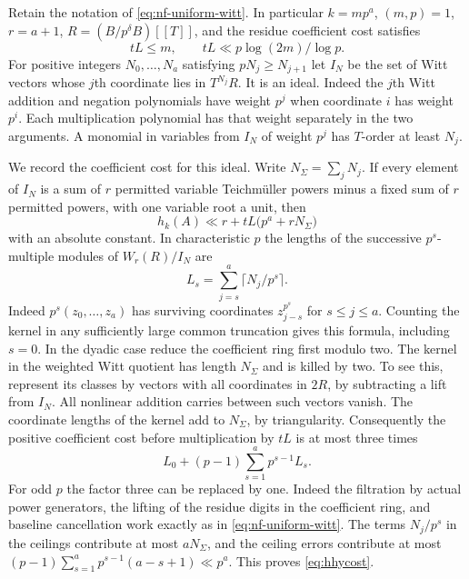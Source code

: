\documentclass[11pt,letterpaper]{article}
\theoremstyle{definition}
\numberwithin{equation}{section}
\begin{document}
Retain the notation of \eqref{eq:nf-uniform-witt}. In particular
$k=mp^a$, $(m,p)=1$, $r=a+1$, $R=(B/p^\delta B)[[T]]$, and the
residue coefficient cost satisfies
\begin{equation}\label{eq:hcoeff}
          tL\le m,\qquad tL\ll p\log(2m)/\log p .
\end{equation}
For positive integers $N_0,\ldots,N_a$ satisfying
$pN_j\ge N_{j+1}$ let $I_N$ be the set of Witt vectors whose
$j$th coordinate lies in $T^{N_j}R$. It is an ideal. Indeed the
$j$th Witt addition and negation polynomials have weight $p^j$ when
coordinate $i$ has weight $p^i$. Each multiplication polynomial
has that weight separately in the two arguments. A monomial in
variables from $I_N$ of weight $p^j$ has $T$-order at least $N_j$.

We record the coefficient cost for this ideal. Write $N_\Sigma=\sum_jN_j$.
If every element of $I_N$ is a sum of $r$ permitted variable
Teichm\"uller powers minus a fixed sum of $r$ permitted powers, with
one variable root a unit, then
\begin{equation}\label{eq:hhycost}
                  h_k(A)\ll r+tL\bigl(p^a+rN_\Sigma\bigr)
\end{equation}
with an absolute constant. In characteristic $p$ the lengths of
the successive $p^s$-multiple modules of $W_r(R)/I_N$ are
\[
             L_s=\sum_{j=s}^a\lceil N_j/p^s\rceil .
\]
Indeed $p^s(z_0,\ldots,z_a)$ has surviving coordinates
$z_{j-s}^{p^s}$ for $s\le j\le a$. Counting the kernel in any
sufficiently large common truncation gives this formula, including
$s=0$. In the dyadic case reduce the coefficient ring first modulo
two. The kernel in the weighted Witt quotient has length $N_\Sigma$
and is killed by two. To see this, represent its classes by vectors
with all coordinates in $2R$, by subtracting a lift from $I_N$.
All nonlinear addition carries between such vectors vanish. The
coordinate lengths of the kernel add to $N_\Sigma$, by triangularity.
Consequently the positive coefficient cost before multiplication by
$tL$ is at most three times
\[
             L_0+(p-1)\sum_{s=1}^a p^{s-1}L_s.
\]
For odd $p$ the factor three can be replaced by one.
Indeed the filtration by actual power generators, the lifting of the
residue digits in the coefficient ring, and baseline cancellation
work exactly as in \eqref{eq:nf-uniform-witt}. The terms $N_j/p^s$
in the ceilings contribute at most $aN_\Sigma$, and the ceiling
errors contribute at most
$(p-1)\sum_{s=1}^a p^{s-1}(a-s+1)\ll p^a$.
This proves \eqref{eq:hhycost}.
\end{document}
